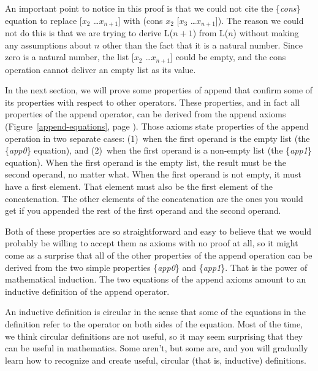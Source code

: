 An important point to notice in this proof is that
we could not cite the \{\emph{cons}\} equation to replace [$x_2$ \dots $x_{n+1}$]
with (cons $x_2$ [$x_3$ \dots $x_{n+1}$]).
The reason we could not do this is that we are trying to derive
L($n+1$) from L($n$) without making any assumptions about $n$
other than the fact that it is a natural number.
Since zero is a natural number, the list [$x_2$ \dots $x_{n+1}$]
could be empty, and the cons operation cannot deliver an empty list as its value.

In the next section, we will prove some properties of append
that confirm some of its properties with respect to other operators.
These properties, and in fact all properties of the append operator,
can be derived from the append axioms (Figure~\ref{append-equations}, page \pageref{append-equations}).
Those axioms state properties of the append operation in two separate cases:
(1)~when the first operand is the empty list (the \{\emph{app0}\} equation), and
(2)~when the first operand is a non-empty list (the \{\emph{app1}\} equation).
When the first operand is the empty list,
the result must be the second operand, no matter what.
When the first operand is not empty, it must have a first element.
That element must also be the first element of the concatenation.
The other elements of the concatenation are the ones you would get
if you appended the rest of the first operand and the second operand.

Both of these properties are so straightforward and easy to believe
that we would probably be willing to accept them as axioms with no proof at all,
so it might come as a surprise that all of the other properties
of the append operation can be derived from
the two simple properties \{\emph{app0}\} and \{\emph{app1}\}.
That is the power of mathematical induction.
The two equations of the append axioms
amount to an inductive definition of the append operator.

An inductive definition is circular in the sense
that some of the equations in the definition refer
to the operator on both sides of the equation.
Most of the time, we think circular definitions are not useful,
so it may seem surprising that they can be useful in mathematics.
Some aren't, but some are, and you will
gradually learn how to recognize and create useful,
circular (that is, inductive) definitions.

